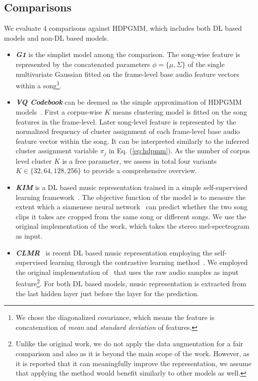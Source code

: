 \documentclass{article}
\begin{document}
\subsection{Comparisons}\label{sec:experimental_setup:comparisons}

We evaluate $4$ comparisons against HDPGMM, which includes both DL based models and non-DL based models.

\begin{itemize}[noitemsep, leftmargin=*]
    \item \emph{\textbf{G1}} is the simplist model among the comparison. The song-wise feature is represented by the concatenated parameters $\phi = \{\mu, \Sigma\}$ of the single multivariate Gaussian fitted on the frame-level base audio feature vectors within a song\footnote{We chose the diagonalized covariance, which means the feature is concatenation of \emph{mean} and \emph{standard deviation} of features.}.

    \item \emph{\textbf{VQ Codebook}} can be deemed as the simple approximation of HDPGMM models~\cite{DBLP:conf/ismir/HoffmanBC08}. First a corpus-wise $K$ means clustering model is fitted on the song features in the frame-level. Later song-level feature is represented by the normalized frequency of cluster assignment of each frame-level base audio feature vector within the song. It can be interpreted similarly to the inferred cluster assignment variable $\pi_{j}$ in Eq. (\ref{eq:hdpmm}). As the number of corpus level cluster $K$ is a free parameter, we assess in total four variants $K \in \{32, 64, 128, 256\}$ to provide a comprehensive overview.

    \item \emph{\textbf{KIM}} is a DL based music representation trained in a simple self-supervised learning framework~\cite{DBLP:journals/nca/KimULH20}. The objective function of the model is to measure the extent which a siamenese neural network~\cite{koch2015siamese} can predict whether the two song clips it takes are cropped from the same song or different songs. We use the original implementation of the work, which takes the stereo mel-spectrogram as input.

    \item \emph{\textbf{CLMR}}~\cite{DBLP:conf/ismir/SpijkervetB21} is recent DL based music representation employing the self-supervised learning through the contrastive learning method~\cite{DBLP:conf/icml/ChenK0H20}. We employed the original implementation of~\cite{DBLP:conf/ismir/SpijkervetB21} that uses the raw audio samples as input feature\footnote{Unlike the original work, we do not apply the data augmentation for a fair comparison and also as it is beyond the main scope of the work. However, as it is reported that it can meaningfully improve the representation, we assume that applying the method would benefit similarly to other models as well.}. For both DL based models, music representation is extracted from the last hidden layer just before the layer for the prediction.


\end{itemize}
\end{document}

